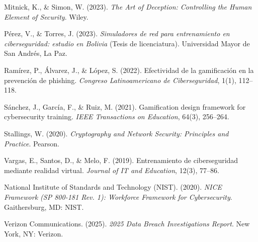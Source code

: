 \vspace{0.3cm}

\noindent Mitnick, K., \& Simon, W. (2023). \textit{The Art of Deception: Controlling the Human Element of Security}. Wiley.

\vspace{0.3cm}

\noindent Pérez, V., \& Torres, J. (2023). \textit{Simuladores de red para entrenamiento en ciberseguridad: estudio en Bolivia} (Tesis de licenciatura). Universidad Mayor de San Andrés, La Paz.

\vspace{0.3cm}

\noindent Ramírez, P., Álvarez, J., \& López, S. (2022). Efectividad de la gamificación en la prevención de phishing. \textit{Congreso Latinoamericano de Ciberseguridad}, 1(1), 112–118.

\vspace{0.3cm}

\noindent Sánchez, J., García, F., \& Ruiz, M. (2021). Gamification design framework for cybersecurity training. \textit{IEEE Transactions on Education}, 64(3), 256–264.

\vspace{0.3cm}

\noindent Stallings, W. (2020). \textit{Cryptography and Network Security: Principles and Practice}. Pearson.

\vspace{0.3cm}

\noindent Vargas, E., Santos, D., \& Melo, F. (2019). Entrenamiento de ciberseguridad mediante realidad virtual. \textit{Journal of IT and Education}, 12(3), 77–86.

\vspace{0.3cm}

\noindent National Institute of Standards and Technology (NIST). (2020). \textit{NICE Framework (SP 800-181 Rev. 1): Workforce Framework for Cybersecurity}. Gaithersburg, MD: NIST.

\vspace{0.3cm}

\noindent Verizon Communications. (2025). \textit{2025 Data Breach Investigations Report}. New York, NY: Verizon.